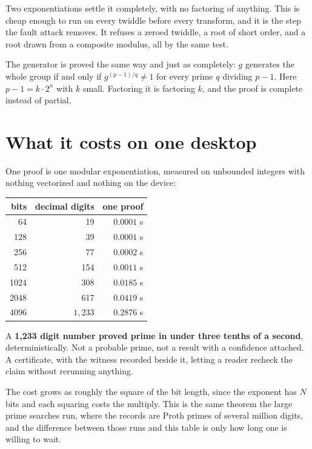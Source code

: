 Two exponentiations settle it completely, with no factoring of anything. This is cheap enough to run on every twiddle before every transform, and it is the step the fault attack removes. It refuses a zeroed twiddle, a root of short order, and a root drawn from a composite modulus, all by the same test.

The generator is proved the same way and just as completely: \(g\) generates the whole group if and only if \(g^{(p-1)/q} \ne 1\) for every prime \(q\) dividing \(p-1\). Here \(p - 1 = k \cdot 2^n\) with \(k\) small. Factoring it is factoring \(k\), and the proof is complete instead of partial.

\section{What it costs on one desktop}

One proof is one modular exponentiation, measured on unbounded integers with nothing vectorized and nothing on the device:

\begin{center}
\begin{tabular}{@{}rrr@{}}
\toprule
bits & decimal digits & one proof \\
\midrule
64 & 19 & \(0.0001\) s \\
128 & 39 & \(0.0001\) s \\
256 & 77 & \(0.0002\) s \\
512 & 154 & \(0.0011\) s \\
1024 & 308 & \(0.0185\) s \\
2048 & 617 & \(0.0419\) s \\
4096 & \(1{,}233\) & \(0.2876\) s \\
\bottomrule
\end{tabular}
\end{center}

A \textbf{1,233 digit number proved prime in under three tenths of a second}, deterministically. Not a probable prime, not a result with a confidence attached. A certificate, with the witness recorded beside it, letting a reader recheck the claim without rerunning anything.

The cost grows as roughly the square of the bit length, since the exponent has \(N\) bits and each squaring costs the multiply. This is the same theorem the large prime searches run, where the records are Proth primes of several million digits, and the difference between those runs and this table is only how long one is willing to wait.

